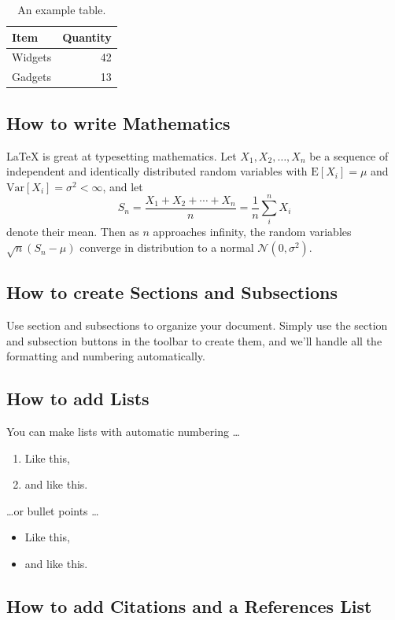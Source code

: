 \begin{table}
\centering
\begin{tabular}{l|r}
Item & Quantity \\\hline
Widgets & 42 \\
Gadgets & 13
\end{tabular}
\caption{\label{tab:widgets}An example table.}
\end{table}

\subsection{How to write Mathematics}

\LaTeX{} is great at typesetting mathematics. Let $X_1, X_2, \ldots, X_n$ be a sequence of independent and identically distributed random variables with $\text{E}[X_i] = \mu$ and $\text{Var}[X_i] = \sigma^2 < \infty$, and let
\[S_n = \frac{X_1 + X_2 + \cdots + X_n}{n}
      = \frac{1}{n}\sum_{i}^{n} X_i\]
denote their mean. Then as $n$ approaches infinity, the random variables $\sqrt{n}(S_n - \mu)$ converge in distribution to a normal $\mathcal{N}(0, \sigma^2)$.


\subsection{How to create Sections and Subsections}

Use section and subsections to organize your document. Simply use the section and subsection buttons in the toolbar to create them, and we'll handle all the formatting and numbering automatically.

\subsection{How to add Lists}

You can make lists with automatic numbering \dots

\begin{enumerate}
\item Like this,
\item and like this.
\end{enumerate}
\dots or bullet points \dots
\begin{itemize}
\item Like this,
\item and like this.
\end{itemize}

\subsection{How to add Citations and a References List}

